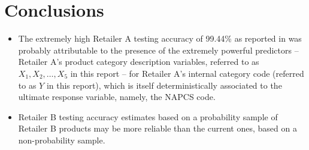 
\section{Conclusions}
\setcounter{theorem}{0}
\setcounter{equation}{0}



\begin{itemize}
\item
	The extremely high Retailer A testing accuracy of 99.44\% as reported
	in \cite{Hatko20180302} was probably attributable to the presence of
	the extremely powerful predictors -- Retailer A's product category description
	variables, referred to as $X_{1},X_{2}, \ldots ,X_{5}$ in this report -- for
	Retailer A's internal category code (referred to as $Y$ in this report),
	which is itself deterministically associated to the ultimate response variable,
	namely, the NAPCS code.
\item
	Retailer B testing accuracy estimates based on a probability sample of
	Retailer B products may be more reliable than the current ones, based
	on a non-probability sample.

%
%

\end{itemize}

